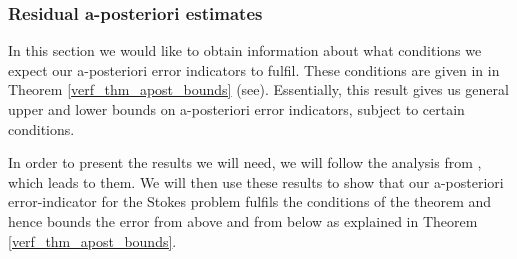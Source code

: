\documentclass[12pt,a4paper]{article}
\theoremstyle{definition}
\begin{document}
\subsubsection{Residual a-posteriori estimates}
In this section we would like to obtain information about what conditions we expect our a-posteriori error indicators to fulfil.  These conditions are given in in Theorem \ref{verf_thm_apost_bounds} (see\cite[Theorem 4.7]{verfurth2013posteriori}).  Essentially, this result gives us general upper and lower bounds on a-posteriori error indicators, subject to certain conditions.  

In order to present the results we will need, we will follow the analysis from \cite[\S4.1.4]{verfurth2013posteriori}, which leads to them.  We will then use these results to show that our a-posteriori error-indicator for the Stokes problem fulfils the conditions of the theorem and hence bounds the error from above and from below as explained in Theorem \ref{verf_thm_apost_bounds}.  
\end{document}
